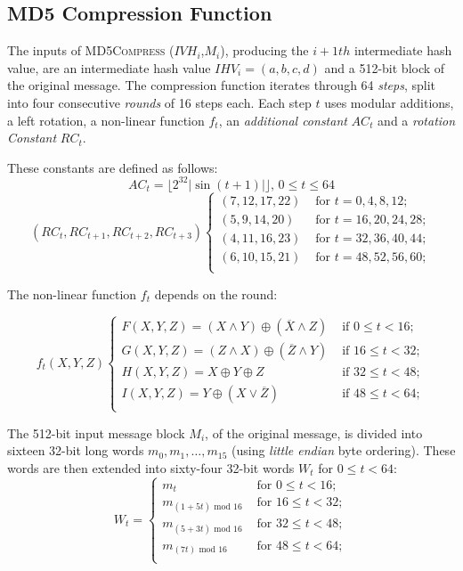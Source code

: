 \subsection{MD5 Compression Function}\label{sec:compressionMD5}
The inputs of \textsc{MD5Compress} ($IVH_i$,$M_i$), producing the $i+1{th}$ intermediate hash value, are an intermediate hash value $IHV_{i}=(a,b,c,d)$ and a 512-bit block of the original message. The compression function iterates through 64 \emph{steps}, split into four consecutive \emph{rounds} of 16 steps each. Each step $t$ uses modular additions, a left rotation, a non-linear function $f_t$, an \emph{additional constant} $AC_t$ and a  \emph{rotation Constant} $RC_t$.

These constants are defined as follows:
\begin{equation}
AC_t = \lfloor 2^{32} \vert \sin(t+1)\vert \rfloor \mbox{, }  0\le t\le 64
\end{equation}
\begin{equation}
(RC_t, RC_{t+1}, RC_{t+2}, RC_{t+3})
\begin{cases}
(7, 12, 17, 22) & \mbox{ for } t = 0,4,8,12; \\
(5, 9, 14, 20) & \mbox{ for } t = 16, 20, 24, 28;\\
(4, 11, 16, 23) & \mbox{ for } t = 32, 36, 40, 44; \\
(6, 10, 15, 21) & \mbox{ for } t = 48,52,56,60; \\
\end{cases}
\end{equation}

The non-linear function $f_t$ depends on the round:

\begin{equation}
f_t(X,Y,Z)
\begin{cases}
F(X, Y, Z) = (X \wedge Y) \oplus (\overline{X} \wedge Z) & \mbox{ if } 0 \le t < 16; \\
G(X, Y, Z) = (Z \wedge X) \oplus (\overline{Z} \wedge Y) & \mbox{ if } 16 \le t < 32; \\
H(X, Y, Z) = X \oplus Y \oplus Z & \mbox{ if } 32 \le t < 48; \\
I(X, Y, Z) = Y \oplus (X \vee \overline{Z}) & \mbox{ if } 48 \le t < 64; \\
\end{cases}
\end{equation}

The 512-bit input message block $M_i$, of the original message, is divided into sixteen 32-bit long words $m_0,m_1,\ldots,m_{15}$ (using \emph{little endian} byte ordering). These words are then extended into sixty-four 32-bit words $W_t$ for $0 \le t < 64$:
\begin{equation}
W_t =
\begin{cases}
m_t & \mbox{ for } 0 \le t < 16; \\
m_{(1+5t)\mbox{ mod }16} & \mbox{ for } 16 \le t < 32; \\
m_{(5+3t)\mbox{ mod }16} & \mbox{ for } 32 \le t < 48; \\
m_{(7t)\mbox{ mod }16} & \mbox{ for } 48 \le t < 64; \\
\end{cases}
\end{equation}

